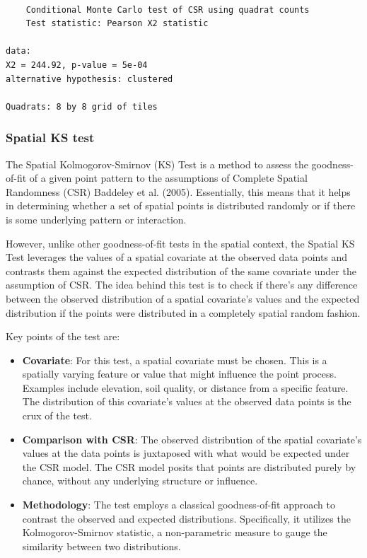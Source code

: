 \documentclass[
  letterpaper,
]{book}
\begin{document}
\begin{verbatim}

    Conditional Monte Carlo test of CSR using quadrat counts
    Test statistic: Pearson X2 statistic

data:  
X2 = 244.92, p-value = 5e-04
alternative hypothesis: clustered

Quadrats: 8 by 8 grid of tiles
\end{verbatim}

\hypertarget{spatial-ks-test}{%
\subsubsection{Spatial KS test}\label{spatial-ks-test}}

The Spatial Kolmogorov-Smirnov (KS) Test is a method to assess the
goodness-of-fit of a given point pattern to the assumptions of Complete
Spatial Randomness (CSR) Baddeley et al. (2005). Essentially, this means
that it helps in determining whether a set of spatial points is
distributed randomly or if there is some underlying pattern or
interaction.

However, unlike other goodness-of-fit tests in the spatial context, the
Spatial KS Test leverages the values of a spatial covariate at the
observed data points and contrasts them against the expected
distribution of the same covariate under the assumption of CSR. The idea
behind this test is to check if there's any difference between the
observed distribution of a spatial covariate's values and the expected
distribution if the points were distributed in a completely spatial
random fashion.

Key points of the test are:

\begin{itemize}
\item
  \textbf{Covariate}: For this test, a spatial covariate must be chosen.
  This is a spatially varying feature or value that might influence the
  point process. Examples include elevation, soil quality, or distance
  from a specific feature. The distribution of this covariate's values
  at the observed data points is the crux of the test.
\item
  \textbf{Comparison with CSR}: The observed distribution of the spatial
  covariate's values at the data points is juxtaposed with what would be
  expected under the CSR model. The CSR model posits that points are
  distributed purely by chance, without any underlying structure or
  influence.
\item
  \textbf{Methodology}: The test employs a classical goodness-of-fit
  approach to contrast the observed and expected distributions.
  Specifically, it utilizes the Kolmogorov-Smirnov statistic, a
  non-parametric measure to gauge the similarity between two
  distributions.
\end{itemize}
\end{document}
